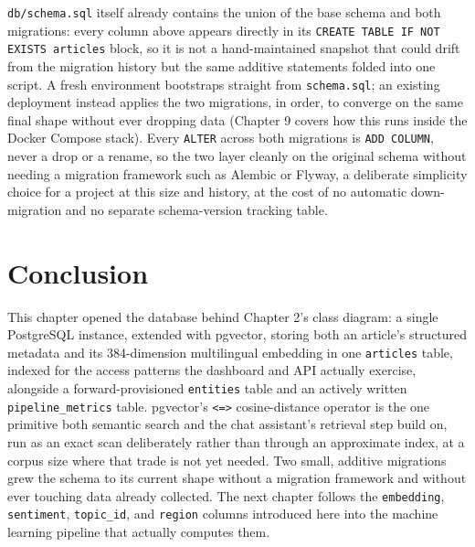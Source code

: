 \texttt{db/schema.sql} itself already contains the union of the base schema and both migrations: every column above appears directly in its \texttt{CREATE TABLE IF NOT EXISTS articles} block, so it is not a hand-maintained snapshot that could drift from the migration history but the same additive statements folded into one script. A fresh environment bootstraps straight from \texttt{schema.sql}; an existing deployment instead applies the two migrations, in order, to converge on the same final shape without ever dropping data (Chapter 9 covers how this runs inside the Docker Compose stack). Every \texttt{ALTER} across both migrations is \texttt{ADD COLUMN}, never a drop or a rename, so the two layer cleanly on the original schema without needing a migration framework such as Alembic or Flyway, a deliberate simplicity choice for a project at this size and history, at the cost of no automatic down-migration and no separate schema-version tracking table.

\section{Conclusion}
This chapter opened the database behind Chapter 2's class diagram: a single PostgreSQL instance, extended with pgvector, storing both an article's structured metadata and its 384-dimension multilingual embedding in one \texttt{articles} table, indexed for the access patterns the dashboard and API actually exercise, alongside a forward-provisioned \texttt{entities} table and an actively written \texttt{pipeline\_metrics} table. pgvector's \texttt{<=>} cosine-distance operator is the one primitive both semantic search and the chat assistant's retrieval step build on, run as an exact scan deliberately rather than through an approximate index, at a corpus size where that trade is not yet needed. Two small, additive migrations grew the schema to its current shape without a migration framework and without ever touching data already collected. The next chapter follows the \texttt{embedding}, \texttt{sentiment}, \texttt{topic\_id}, and \texttt{region} columns introduced here into the machine learning pipeline that actually computes them.
